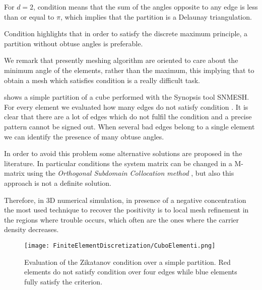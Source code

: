 \begin{Osservazione}
For $d=2$, condition  means that the sum of the angles opposite to any edge is less than or equal to $\pi$, which implies that the partition is a Delaunay triangulation.
\end{Osservazione}

\begin{Osservazione}
Condition  highlights that in order to satisfy the discrete maximum principle, a partition without obtuse angles is preferable.
\end{Osservazione}

We remark that presently meshing algorithm are oriented to care about the minimum angle of the elements, rather than the maximum, this implying that to obtain a mesh which satisfies condition  is a really difficult task. 

 shows a simple partition of a cube performed with the Synopsis tool SNMESH. For every element we evaluated how many edges do not satisfy condition .
It is clear that there are a lot of edges which do not fulfil the condition and a precise pattern cannot be signed out. When several bad edges belong to a single element we can identify the presence of many obtuse angles.

In order to avoid this problem some alternative solutions are proposed in the literature. In particular conditions the system matrix can be changed in a M-matrix using the \textit{Orthogonal Subdomain Collocation method} \cite{OSCputticorded}, but also this approach is not a definite solution. 

Therefore, in 3D numerical simulation, in presence of a negative concentration the most used technique to recover the positivity is to local mesh refinement in the regions where trouble occurs, which often are the ones where the carrier density decreases.



\begin{figure}[!b]
\centering
{\texttt{[image: FiniteElementDiscretization/CuboElementi.png]}}
\caption{Evaluation of the Zikatanov condition over a simple partition. Red elements do not satisfy condition   over four edges while blue elements fully satisfy the criterion.}
\label{fig: cubo zikatanov}
\end{figure}

